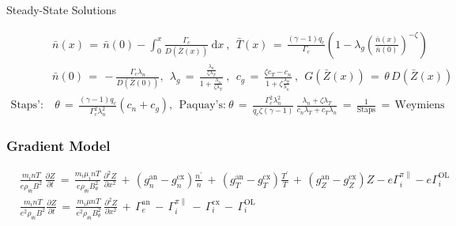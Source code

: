 \documentclass[a4paper,8pt]{article}
\begin{document}
\normalsize

Steady-State Solutions \small

\begin{align}
    &\bar{n}(x) \,=\, \bar{n}(0) - \int_0^x \frac{\Gamma_c}{D(\bar{Z}(x))}~\text{d}x~,
        ~~ \bar{T}(x) \,=\, \frac{(\gamma - 1) q_c}{\Gamma_c} \left(1 - \lambda_g\left(\frac{\bar{n}(x)}{\bar{n}(0)}\right)^{-\zeta}\right) \\
    &\bar{n}(0) \,=\, -\frac{\Gamma_c \lambda_n}{D(\bar{Z}(0))},
        ~~ \lambda_g \,=\, \frac{\frac{\lambda_n}{\zeta \lambda_T}}{1 + \frac{\lambda_n}{\zeta \lambda_T}}~,
        ~~ c_g \,=\, \frac{\zeta c_T - c_n}{1 + \zeta \frac{\lambda_T}{\lambda_n}}~, ~~ G(\bar{Z}(x)) \,=\, \theta\,D(\bar{Z}(x)) \\
    \text{Staps':}& ~ \theta \,=\, \frac{(\gamma - 1) q_c}{\Gamma_c^2 \lambda_n^2} (c_n + c_g), ~~ \text{Paquay's:} ~ \theta \,=\, \frac{\Gamma_c^2 \lambda_n^2}{q_c \zeta (\gamma - 1)} \, \frac{\lambda_n + \zeta\lambda_T}{c_n\lambda_T + c_T\lambda_n} \,=\, \frac{1}{\text{Staps}} \,=\, \text{Weymiens}
\end{align}

\normalsize

\subsubsection{Gradient Model}\label{gradient-model}

\small

\begin{align}
    &\frac{m_i n T}{e \rho_{\theta i} B^2} \, \frac{\partial Z}{\partial t}
        \,=\, \frac{m_i \mu_i n T}{e \rho_{\theta i} B_\theta^2} \,
        \frac{\partial^2 Z}{\partial x^2} \,+\, \left(g_n^\text{an} -
        g_n^\text{cx}\right) \frac{n^\prime}{n} \,+\, \left(g_T^\text{an} -
        g_T^\text{cx}\right) \frac{T^\prime}{T} \,+\, \left(g_Z^\text{an} -
        g_Z^\text{cx}\right) Z - e\Gamma_i^{\pi\parallel} - e\Gamma_i^\text{OL} \\
    &\frac{m_i n T}{e^2 \rho_{\theta i} B^2} \frac{\partial Z}{\partial t}
        \,=\, \frac{m_i \mu n T}{e^2 \rho_{\theta i} B_\theta^2} \, 
        \frac{\partial^2 Z}{\partial x^2} \,+\, \Gamma_e^\text{an} \,-\,
        \Gamma_i^{\pi\parallel} \,-\, \Gamma_i^\text{cx} \,-\,
        \Gamma_i^\text{OL}
\end{align}

\normalsize
\end{document}
